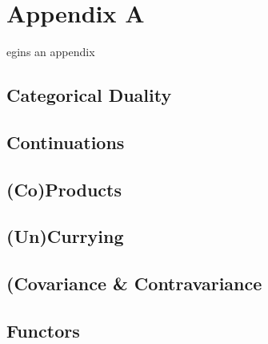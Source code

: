 %
%

\chapter{Appendix A}
\label{app:a}

egins an appendix\\

\section{Categorical Duality}
\section{Continuations}
\section{(Co)Products}
\section{(Un)Currying}
\section{(Covariance \& Contravariance}
\section{Functors}









\